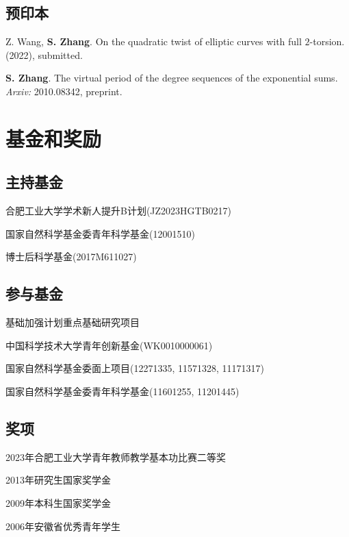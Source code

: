 \documentclass[11pt]{article}
\begin{document}
\subsection{预印本}
\begin{cvlist}

	\item Z. Wang, \textbf{S. Zhang}.
	On the quadratic twist of elliptic curves with full $2$-torsion.
	(2022), submitted.

	\item \textbf{S. Zhang}.
	The virtual period of the degree sequences of the exponential sums.
	{\em Arxiv:} 2010.08342, preprint.
\end{cvlist}

\section{基金和奖励}
\subsection{主持基金}
\begin{cvlist}
	\item 合肥工业大学学术新人提升B计划(JZ2023HGTB0217)
	\item 国家自然科学基金委青年科学基金(12001510)
	\item 博士后科学基金(2017M611027)
\end{cvlist}


\subsection{参与基金}
\begin{cvlist}
	\item 基础加强计划重点基础研究项目
	\item 中国科学技术大学青年创新基金(WK0010000061)
	\item 国家自然科学基金委面上项目(12271335, 11571328, 11171317)
	\item 国家自然科学基金委青年科学基金(11601255, 11201445)
\end{cvlist}


\subsection{奖项}
\begin{cvlist}
	\item 2023年合肥工业大学青年教师教学基本功比赛二等奖
	\item 2013年研究生国家奖学金
	\item 2009年本科生国家奖学金
	\item 2006年安徽省优秀青年学生
\end{cvlist}
\end{document}
